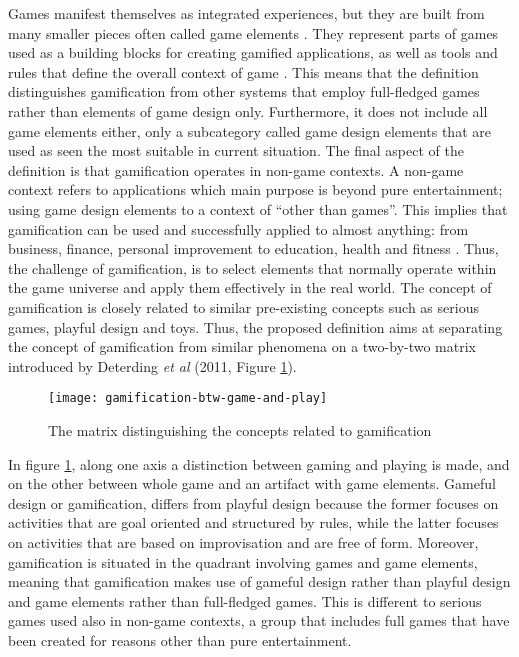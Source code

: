 Games manifest themselves as integrated experiences, but they are built from many smaller pieces often called game elements \cite{werbach2012win}. They represent parts of games used as a building blocks for creating gamified applications, as well as tools and rules that define the overall context of game \cite{gamDesElem}. This means that the definition distinguishes gamification from other systems that employ full-fledged games rather than elements of game design only. Furthermore, it does not include all game elements either, only a subcategory called game design elements that are used as seen the most suitable in current situation. %
The final aspect of the definition is that gamification operates in non-game contexts. A non-game context refers to applications which main purpose is beyond pure entertainment; using game design elements to a context of ``other than games''. This implies that gamification can be used and successfully applied to almost anything: from business, finance, personal improvement to education, health and fitness \cite{deterding2011game}. Thus, the challenge of gamification, is to select elements that normally operate within the game universe and apply them effectively in the real world.
The concept of gamification is closely related to similar pre-existing concepts such as serious games, playful design and toys. Thus, the proposed definition aims at separating the concept of gamification from similar phenomena on a two-by-two matrix introduced by Deterding \textit{et al} (2011, Figure \ref{fig:mesh1}). 
\begin{figure}[h]
    \centering
    \texttt{[image: gamification-btw-game-and-play]}
    \caption{The matrix distinguishing the concepts related to gamification}
    \label{fig:mesh1}
\end{figure}
In figure \ref{fig:mesh1}, along one axis a distinction between gaming and playing is made, and on the other between whole game and an artifact with game elements. Gameful design or gamification, differs from playful design because the former focuses on activities that are goal oriented and structured by rules, while the latter focuses on activities that are based on improvisation and are free of form. Moreover, gamification is situated in the quadrant involving games and game elements, meaning that gamification makes use of gameful design rather than playful design and game elements rather than full-fledged games. This is different to serious games used also in non-game contexts, a group that includes full games that have been created for reasons other than pure entertainment. 
